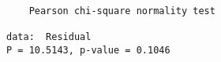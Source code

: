 \begin{verbatim} 

	Pearson chi-square normality test

data:  Residual
P = 10.5143, p-value = 0.1046

\end{verbatim}